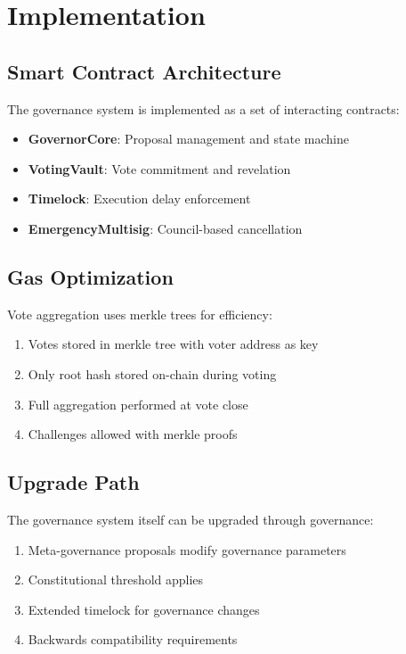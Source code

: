 \documentclass[11pt,a4paper]{article}
\theoremstyle{definition}
\theoremstyle{remark}
\begin{document}
\section{Implementation}

\subsection{Smart Contract Architecture}

The governance system is implemented as a set of interacting contracts:

\begin{itemize}
    \item \textbf{GovernorCore}: Proposal management and state machine
    \item \textbf{VotingVault}: Vote commitment and revelation
    \item \textbf{Timelock}: Execution delay enforcement
    \item \textbf{EmergencyMultisig}: Council-based cancellation
\end{itemize}

\subsection{Gas Optimization}

Vote aggregation uses merkle trees for efficiency:
\begin{enumerate}
    \item Votes stored in merkle tree with voter address as key
    \item Only root hash stored on-chain during voting
    \item Full aggregation performed at vote close
    \item Challenges allowed with merkle proofs
\end{enumerate}

\subsection{Upgrade Path}

The governance system itself can be upgraded through governance:
\begin{enumerate}
    \item Meta-governance proposals modify governance parameters
    \item Constitutional threshold applies
    \item Extended timelock for governance changes
    \item Backwards compatibility requirements
\end{enumerate}
\end{document}
